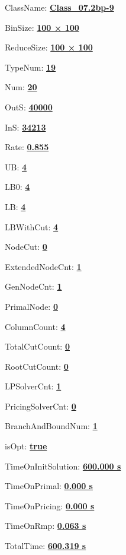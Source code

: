 \documentclass[11pt]{article}
\begin{document}
\pagestyle{empty}


ClassName: \underline{\textbf{Class_07.2bp-9}}
\par
BinSize: \underline{\textbf{100 × 100}}
\par
ReduceSize: \underline{\textbf{100 × 100}}
\par
TypeNum: \underline{\textbf{19}}
\par
Num: \underline{\textbf{20}}
\par
OutS: \underline{\textbf{40000}}
\par
InS: \underline{\textbf{34213}}
\par
Rate: \underline{\textbf{0.855}}
\par
UB: \underline{\textbf{4}}
\par
LB0: \underline{\textbf{4}}
\par
LB: \underline{\textbf{4}}
\par
LBWithCut: \underline{\textbf{4}}
\par
NodeCut: \underline{\textbf{0}}
\par
ExtendedNodeCnt: \underline{\textbf{1}}
\par
GenNodeCnt: \underline{\textbf{1}}
\par
PrimalNode: \underline{\textbf{0}}
\par
ColumnCount: \underline{\textbf{4}}
\par
TotalCutCount: \underline{\textbf{0}}
\par
RootCutCount: \underline{\textbf{0}}
\par
LPSolverCnt: \underline{\textbf{1}}
\par
PricingSolverCnt: \underline{\textbf{0}}
\par
BranchAndBoundNum: \underline{\textbf{1}}
\par
isOpt: \underline{\textbf{true}}
\par
TimeOnInitSolution: \underline{\textbf{600.000 s}}
\par
TimeOnPrimal: \underline{\textbf{0.000 s}}
\par
TimeOnPricing: \underline{\textbf{0.000 s}}
\par
TimeOnRmp: \underline{\textbf{0.063 s}}
\par
TotalTime: \underline{\textbf{600.319 s}}
\par
\newpage


\end{document}
